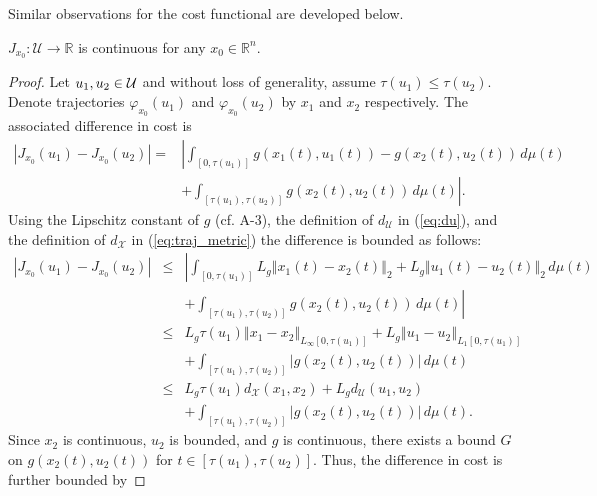 \documentclass{llncs}
\begin{document}
Similar observations for the cost functional are developed below.

\begin{lemma} \label{lem:cost_cont}
%
$J_{x_0}:\mathcal{U}\rightarrow\mathbb{R}$ is continuous for any $x_0\in \mathbb{R}^n$.
%
\end{lemma}
%
\begin{proof}
Let $u_{1},u_{2}\in\mbox{\ensuremath{\mathcal{U}}}$ and without
loss of generality, assume $\tau(u_{1})\leq\tau(u_{2})$. Denote
trajectories $\varphi_{x_{0}}(u_{1})$ and $\varphi_{x_{0}}(u_{2})$ by
$x_{1}$ and $x_{2}$ respectively. The associated difference in cost is 
\begin{equation}
\begin{array}{rl}
\left|J_{x_0}(u_{1})-J_{x_0}(u_{2})\right|= & \left|\int_{\left[0,\tau(u_{1})\right]}g\left(x_{1}(t),u_{1}(t)\right)\right.-g\left(x_{2}(t),u_{2}(t)\right)\, d\mu(t)\\
 & +\left.\int_{\left[\tau(u_{1}),\tau(u_{2})\right]}g\left(x_{2}(t),u_{2}(t)\right)\, d\mu(t)\right|.
\end{array}
\end{equation}
Using the Lipschitz constant of $g$ (cf. A-3), the definition of $d_{\mathcal{U} }$ in (\ref{eq:du}), and the definition of $d_{\mathcal{X} }$ in (\ref{eq:traj_metric}) the difference is bounded as follows: 
\begin{equation}
\begin{array}{rcl}
\left|J_{x_0}(u_{1})-J_{x_0}(u_{2})\right| & \leq & \left|\int_{\left[0,\tau(u_{1})\right]} L_{g}\left\Vert x_{1}(t)-x_{2}(t)\right\Vert _{2}\right.+L_{g}\left\Vert u_{1}(t)-u_{2}(t)\right\Vert _{2}\, d\mu(t) \\
 &  & +\left.\int_{\left[\tau(u_{1}),\tau(u_{2})\right]}g\left(x_{2}(t),u_{2}(t)\right)\, d\mu(t)\right|\\
 & \leq & L_{g}\tau(u_{1})\left\Vert x_{1}-x_{2}\right\Vert _{L_{\infty}\left[0,\tau(u_{1})\right]}+L_{g}\left\Vert u_{1}-u_{2}\right\Vert _{L_{1}\left[0,\tau(u_{1})\right]}\\
 &  & +\int_{\left[\tau(u_{1}),\tau(u_{2})\right]}\left|g\left(x_{2}(t),u_{2}(t)\right)\right|\, d\mu(t)\\
 & \leq & L_{g}\tau(u_{1}) d_{\mathcal{X}}(x_1,x_2)+ L_{g}d_{\mathcal{U}}(u_1,u_2)\\ 
& &  +\int_{\left[\tau(u_{1}),\tau(u_{2})\right]}\left|g\left(x_{2}(t),u_{2}(t)\right)\right|\, d\mu(t). 
\end{array}\label{eq:cost_diff}
\end{equation}
Since $x_2$ is continuous, $u_2$ is bounded, and $g$ is continuous, there exists a bound $G$ on $g(x_2(t),u_2(t))$ for $t\in [\tau(u_1),\tau(u_2)]$. Thus, the difference in cost is further bounded by  


\end{proof}
\end{document}
